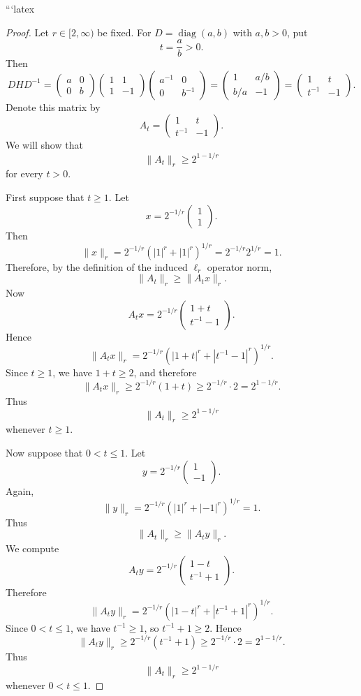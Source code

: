 ```latex
\begin{proof}
Let $r \in [2,\infty)$ be fixed. For $D=\operatorname{diag}(a,b)$ with $a,b>0$, put
\[
t=\frac{a}{b}>0.
\]
Then
\[
DHD^{-1}
=
\begin{pmatrix}
a & 0\\
0 & b
\end{pmatrix}
\begin{pmatrix}
1 & 1\\
1 & -1
\end{pmatrix}
\begin{pmatrix}
a^{-1} & 0\\
0 & b^{-1}
\end{pmatrix}
=
\begin{pmatrix}
1 & a/b\\
b/a & -1
\end{pmatrix}
=
\begin{pmatrix}
1 & t\\
t^{-1} & -1
\end{pmatrix}.
\]
Denote this matrix by
\[
A_t=\begin{pmatrix}
1 & t\\
t^{-1} & -1
\end{pmatrix}.
\]
We will show that
\[
\|A_t\|_r \geq 2^{1-1/r}
\]
for every $t>0$.

First suppose that $t\geq 1$. Let
\[
x=2^{-1/r}\begin{pmatrix}1\\1\end{pmatrix}.
\]
Then
\[
\|x\|_r
=
2^{-1/r}\left(|1|^r+|1|^r\right)^{1/r}
=
2^{-1/r}2^{1/r}
=
1.
\]
Therefore, by the definition of the induced $\ell_r$ operator norm,
\[
\|A_t\|_r \geq \|A_t x\|_r.
\]
Now
\[
A_t x
=
2^{-1/r}
\begin{pmatrix}
1+t\\
t^{-1}-1
\end{pmatrix}.
\]
Hence
\[
\|A_t x\|_r
=
2^{-1/r}
\left(|1+t|^r+|t^{-1}-1|^r\right)^{1/r}.
\]
Since $t\geq 1$, we have $1+t\geq 2$, and therefore
\[
\|A_t x\|_r
\geq
2^{-1/r}(1+t)
\geq
2^{-1/r}\cdot 2
=
2^{1-1/r}.
\]
Thus
\[
\|A_t\|_r \geq 2^{1-1/r}
\]
whenever $t\geq 1$.

Now suppose that $0<t\leq 1$. Let
\[
y=2^{-1/r}\begin{pmatrix}1\\-1\end{pmatrix}.
\]
Again,
\[
\|y\|_r
=
2^{-1/r}\left(|1|^r+|-1|^r\right)^{1/r}
=
1.
\]
Thus
\[
\|A_t\|_r \geq \|A_t y\|_r.
\]
We compute
\[
A_t y
=
2^{-1/r}
\begin{pmatrix}
1-t\\
t^{-1}+1
\end{pmatrix}.
\]
Therefore
\[
\|A_t y\|_r
=
2^{-1/r}
\left(|1-t|^r+|t^{-1}+1|^r\right)^{1/r}.
\]
Since $0<t\leq 1$, we have $t^{-1}\geq 1$, so $t^{-1}+1\geq 2$. Hence
\[
\|A_t y\|_r
\geq
2^{-1/r}(t^{-1}+1)
\geq
2^{-1/r}\cdot 2
=
2^{1-1/r}.
\]
Thus
\[
\|A_t\|_r \geq 2^{1-1/r}
\]
whenever $0<t\leq 1$.


\end{proof}
